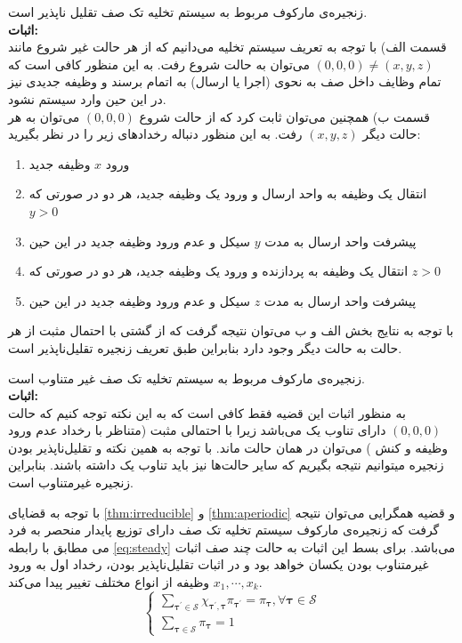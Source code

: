 \begin{thm}
\label{thm:irreducible}
زنجیره‌ی مارکوف مربوط به سیستم تخلیه تک صف تقلیل ناپذیر است. \\
\textbf{اثبات:} \\
قسمت الف) با توجه به تعریف سیستم تخلیه می‌دانیم که از هر حالت غیر شروع مانند \( (0, 0, 0) \neq (x, y, z)\) می‌توان به حالت شروع رفت. به این منظور کافی است که تمام وظایف داخل صف به نحوی (اجرا یا ارسال) به اتمام برسند و وظیفه جدیدی نیز در این حین وارد سیستم نشود. \\

قسمت ب) همچنین می‌توان ثابت کرد که از حالت شروع \((0, 0, 0)\) می‌توان به هر حالت دیگر \((x, y, z)\) رفت. به این منظور دنباله رخدادهای زیر را در نظر بگیرید:
\begin{enumerate}
	\item ورود \(x\) وظیفه جدید
	\item انتقال یک وظیفه به واحد ارسال و ورود یک وظیفه جدید، هر دو در صورتی که \(y > 0\)
	\item پیشرفت واحد ارسال به مدت \(y\) سیکل و عدم ورود وظیفه جدید در این حین
	\item انتقال یک وظیفه به پردازنده و ورود یک وظیفه جدید، هر دو در صورتی که \(z > 0\)
	\item پیشرفت واحد ارسال به مدت \(z\) سیکل و عدم ورود وظیفه جدید در این حین
\end{enumerate}
با توجه به نتایج بخش الف و ب می‌توان نتیجه گرفت که از گشتی با احتمال مثبت از هر حالت به حالت دیگر وجود دارد بنابراین طبق تعریف زنجیره تقلیل‌ناپذیر است.
\end{thm}
\begin{thm}
\label{thm:aperiodic}
زنجیره‌ی مارکوف مربوط به سیستم تخلیه تک صف غیر متناوب است. \\
\textbf{اثبات:} \\
به منظور اثبات این قضیه فقط کافی است که به این نکته توجه کنیم که حالت \((0, 0, 0)\) دارای تناوب یک می‌باشد زیرا با احتمالی مثبت (متناظر با رخداد عدم ورود وظیفه و کنش ) می‌توان در همان حالت ماند. با توجه به همین نکته و تقلیل‌ناپذیر بودن زنجیره میتوانیم نتیجه بگیریم که سایر حالت‌ها نیز باید تناوب یک داشته باشند. بنابراین زنجیره غیرمتناوب است.
\end{thm}
با توجه به قضایای \ref{thm:irreducible} و \ref{thm:aperiodic} و قضیه همگرایی می‌توان نتیجه گرفت که زنجیره‌ی مارکوف سیستم تخلیه تک صف دارای توزیع پایدار منحصر به فرد می‌ مطابق با رابطه \ref{eq:steady} می‌باشد. برای بسط این اثبات به حالت چند صف اثبات غیرمتناوب بودن یکسان خواهد بود و در اثبات تقلیل‌ناپذیر بودن، رخداد اول به ورود \(x_1, \cdots, x_k\) وظیفه از انواع مختلف تغییر پیدا می‌کند.
\begin{equation}
	\label{eq:steady}
	\left\{\begin{array}{l}
		\sum_{\boldsymbol{\tau}^{\prime} \in \mathcal{S}} \chi_{\boldsymbol{\tau}^{\prime}, \boldsymbol{\tau}} \pi_{\boldsymbol{\tau}^{\prime}}=\pi_{\boldsymbol{\tau}}, \forall \boldsymbol{\tau} \in \mathcal{S} \\
		\sum_{\boldsymbol{\tau} \in \mathcal{S}} \pi_{\boldsymbol{\tau}}=1
	\end{array}\right.
\end{equation}
